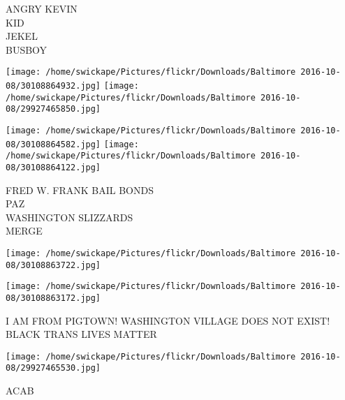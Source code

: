 \documentclass[10pt,letterpaper]{article}
\begin{document}
ANGRY KEVIN\\
KID\\
JEKEL\\
BUSBOY
\pagebreak

\texttt{[image: /home/swickape/Pictures/flickr/Downloads/Baltimore 2016-10-08/30108864932.jpg]}
\texttt{[image: /home/swickape/Pictures/flickr/Downloads/Baltimore 2016-10-08/29927465850.jpg]}

\texttt{[image: /home/swickape/Pictures/flickr/Downloads/Baltimore 2016-10-08/30108864582.jpg]}
\texttt{[image: /home/swickape/Pictures/flickr/Downloads/Baltimore 2016-10-08/30108864122.jpg]}

FRED W. FRANK BAIL BONDS\\
PAZ\\
WASHINGTON SLIZZARDS\\
MERGE
\pagebreak

\texttt{[image: /home/swickape/Pictures/flickr/Downloads/Baltimore 2016-10-08/30108863722.jpg]}

\vspace{0.25in}
\texttt{[image: /home/swickape/Pictures/flickr/Downloads/Baltimore 2016-10-08/30108863172.jpg]}

I AM FROM PIGTOWN!  WASHINGTON VILLAGE DOES NOT EXIST!\\
BLACK TRANS LIVES MATTER
\pagebreak

\texttt{[image: /home/swickape/Pictures/flickr/Downloads/Baltimore 2016-10-08/29927465530.jpg]}

ACAB
\pagebreak
\end{document}
